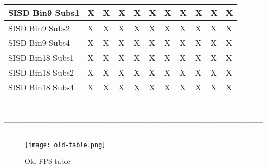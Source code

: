 \documentclass[11pt]{article}
\begin{document}
\begin{table}[ht]
\begin{tabular}{|l|l|l|l|l|l|l|l|l|l|l|}
        \hline                                                                                                     
        \hline                                                                                                     
        SISD Bin9 Subs1  & X     & X     & X     & X     & X     & X     & X     & X     & X     & X     \\ \hline
        SISD Bin9 Subs2  & X     & X     & X     & X     & X     & X     & X     & X     & X     & X     \\ \hline
        SISD Bin9 Subs4  & X     & X     & X     & X     & X     & X     & X     & X     & X     & X     \\ \hline
        SISD Bin18 Subs1 & X     & X     & X     & X     & X     & X     & X     & X     & X     & X     \\ \hline
        SISD Bin18 Subs2 & X     & X     & X     & X     & X     & X     & X     & X     & X     & X     \\ \hline
        SISD Bin18 Subs4 & X     & X     & X     & X     & X     & X     & X     & X     & X     & X     \\ \hline
    \end{tabular}
\end{table}

\_\_\_\_\_\_\_\_\_\_\_\_\_\_\_\_\_\_\_\_\_\_\_\_\_\_\_\_\_\_\_\_\_\_\_\_\_\_\_\_\_\_\_\_\_\_\_\_\_\_\_\_\_\_\_\_\_\_\_\_\_\_\_\_\_\_\_\_\_\_\_\_\_\_\_\_\_\_\_\_\_\_\_\_\_\_\_\_\_\_\_\_\_\_\_\_\_\_\_\_\_\_\_\_\_\_\_\_\_\_\_\_\_\_\_\_\_\_\_\_\_\_

\begin{figure}[htb]
    \centering
    \caption*{Old FPS table}
    \texttt{[image: old-table.png]}
    \label{fig:fig}
\end{figure}
\end{document}
